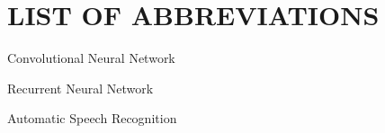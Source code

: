 \chapter*{LIST OF ABBREVIATIONS}



\begin{description}[leftmargin=3cm, style=nextline, labelwidth=2cm, labelsep=1cm]
\item[CNN] Convolutional Neural Network
\item[RNN] Recurrent Neural Network 
\item[ASR] Automatic Speech Recognition 
    

\end{description}